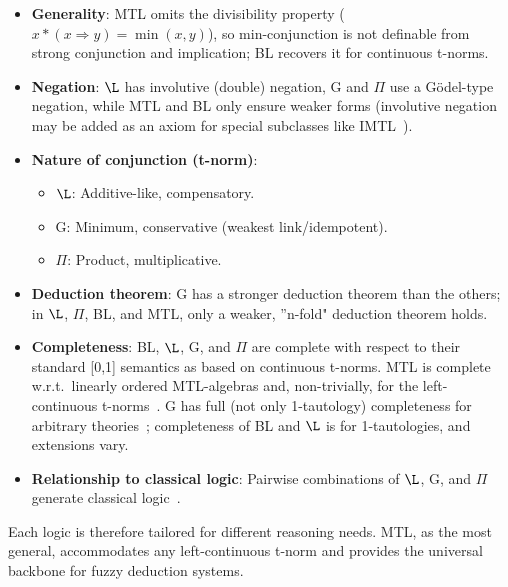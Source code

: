 \begin{itemize}
    \item \textbf{Generality}: MTL omits the divisibility property ($x*(x \Rightarrow y)=\min(x,y)$), so min-conjunction is not definable from strong conjunction and implication; BL recovers it for continuous t-norms.
    \item \textbf{Negation}: $\L$ has involutive (double) negation, G and $\Pi$ use a Gödel-type negation, while MTL and BL only ensure weaker forms (involutive negation may be added as an axiom for special subclasses like IMTL~\cite{GodoMonoidal}).
    \item \textbf{Nature of conjunction (t-norm)}:
        \begin{itemize}
            \item $\L$: Additive-like, compensatory.
            \item G: Minimum, conservative (weakest link/idempotent).
            \item $\Pi$: Product, multiplicative.
        \end{itemize}
    \item \textbf{Deduction theorem}: G has a stronger deduction theorem than the others; in $\L$, $\Pi$, BL, and MTL, only a weaker, ''n-fold" deduction theorem holds.
    \item \textbf{Completeness}: BL, $\L$, G, and $\Pi$ are complete with respect to their standard [0,1] semantics as based on continuous t-norms. MTL is complete w.r.t.\ linearly ordered MTL-algebras and, non-trivially, for the left-continuous t-norms~\cite{Jenei2001MTLCompl}. G has full (not only 1-tautology) completeness for arbitrary theories~\cite[Thm. 4.2.17]{Hajek1998}; completeness of BL and $\L$ is for 1-tautologies, and extensions vary.
    \item \textbf{Relationship to classical logic}: Pairwise combinations of $\L$, G, and $\Pi$ generate classical logic~\cite[Thm. 4.3.9]{Hajek1998}.
\end{itemize}
Each logic is therefore tailored for different reasoning needs. MTL, as the most general, accommodates any left-continuous t-norm and provides the universal backbone for fuzzy deduction systems.




